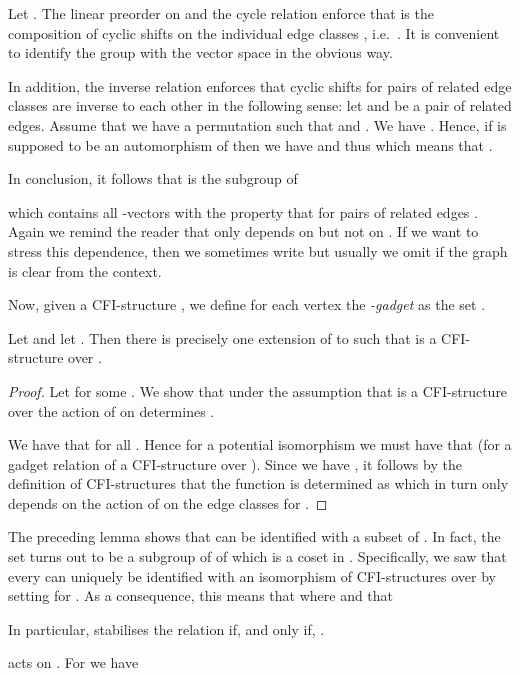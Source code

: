 \documentclass[a4paper,UKenglish]{lipics}
\theoremstyle{plain}
\begin{document}
Let .
The linear preorder  on  and the cycle 
relation  enforce that  is the composition of
 cyclic shifts on the individual edge classes , i.e.\ 
 .
It is convenient to identify the group  with the vector space  in the 
obvious way. 

In addition, the inverse relation  enforces that cyclic shifts for 
pairs of related edge classes are inverse to each other in the following sense: 
let  and  be a pair of related edges.
Assume that we have a permutation  such that  
and . We have . Hence, if  is supposed 
to be an automorphism of  then we have  and thus 
 which means that .

In conclusion, it follows that  is the subgroup of 
 
which contains all -vectors  with
the property that  for pairs of related edges 
. 
Again we remind the reader that  only depends on  but 
not on . If we want to stress this dependence, then we 
sometimes write  but usually we omit  if the graph is 
clear from the context.

Now, given a CFI-structure , we define for 
each vertex  the \emph{-gadget} as the set .

\begin{lemma}
Let  and let . 
Then there is precisely one extension  of 
to  such that  is a CFI-structure 
over .
\end{lemma}
\begin{proof}
 Let  for some . We show that 
under 
the 
assumption that  is a CFI-structure over  the 
action of  on  determines .

We have that  for all . Hence for a 
potential isomorphism  we must have that 
 (for a gadget relation 
 of a CFI-structure over ). 
Since we have , it follows by the 
definition of CFI-structures that the function  is determined as
 which in turn only depends on the 
action of  on the edge classes  for .
\end{proof}


\smallskip
The preceding lemma shows that  can be identified with 
a subset of . In fact, the set 
 turns out to be a subgroup of  of which  
is a coset in .
Specifically, we saw that every  can uniquely be 
identified with an isomorphism of CFI-structures over  by setting
 for  . As a consequence, 
this 
means that  where  and that 

In particular,  stabilises the relation  if, 
and only if, .

\begin{lemma}\label{lemma:action:on:cfi}
 acts on . For  we have  

\end{lemma}
\end{document}
